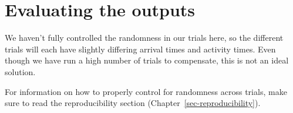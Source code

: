 \documentclass[
  letterpaper,
  DIV=11,
  numbers=noendperiod]{scrreprt}
\begin{document}
\section{Evaluating the outputs}\label{evaluating-the-outputs-8}

\begin{tcolorbox}[enhanced jigsaw, colframe=quarto-callout-warning-color-frame, bottomtitle=1mm, breakable, rightrule=.15mm, coltitle=black, colbacktitle=quarto-callout-warning-color!10!white, opacityback=0, leftrule=.75mm, arc=.35mm, toptitle=1mm, title=\textcolor{quarto-callout-warning-color}{\faExclamationTriangle}\hspace{0.5em}{Warning}, titlerule=0mm, colback=white, toprule=.15mm, bottomrule=.15mm, left=2mm, opacitybacktitle=0.6]

We haven't fully controlled the randomness in our trials here, so the
different trials will each have slightly differing arrival times and
activity times. Even though we have run a high number of trials to
compensate, this is not an ideal solution.

For information on how to properly control for randomness across trials,
make sure to read the reproducibility section
(Chapter~\ref{sec-reproducibility}).

\end{tcolorbox}
\end{document}
